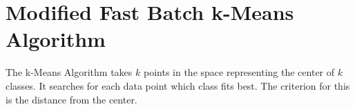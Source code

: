 ﻿\section{Modified Fast Batch k-Means Algorithm}
\label{sec:TheoryKMeans}
The k-Means Algorithm takes $k$ points in the space representing the center of $k$ classes. It searches for each data point which class fits best. The criterion for this is the distance from the center. 